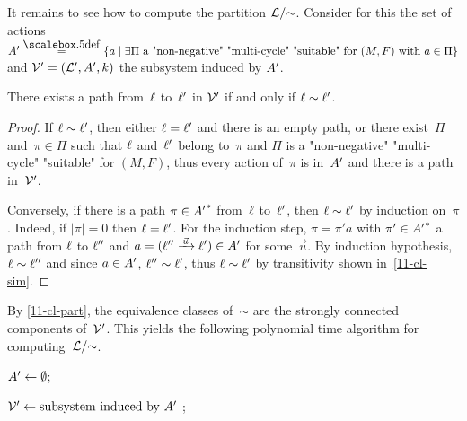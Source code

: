 \begin{scope}
\begin{algorithm}

\caption{$\text{cycle}(\?V,M,F)$}
\label{11-algo:zcycle}
\end{algorithm}

It remains to see how to compute the partition $\mathcal L/{\sim}$. Consider
for this the set of actions
$\Act'\eqdef\{a\mid\exists\Pi\text{ a "non-negative" "multi-cycle"
  "suitable" for $(M,F)$ with $a\in\Pi$}\}$ and
$\mathcal V'=(\mathcal L',A',k)$ the subsystem induced by $A'$.
\begin{claim}\label{11-cl-part}
  There exists a path from~$\ell$ to~$\ell'$ in $\mathcal V'$
  if and only if $\ell\sim\ell'$.
\end{claim}
\begin{proof}
  If $\ell\sim\ell'$, then either $\ell=\ell'$ and there is an empty
  path, or there exist~$\Pi$ and~$\pi\in\Pi$ such that $\ell$
  and~$\ell'$ belong to~$\pi$ and $\Pi$ is a "non-negative"
  "multi-cycle" "suitable" for $(M,F)$, thus every action of~$\pi$ is
  in~$A'$ and there is a path in~$\mathcal V'$.  

  Conversely, if there is a path $\pi\in{A'}^\ast$ from~$\ell$
  to~$\ell'$, then $\ell\sim\ell'$ by induction on~$\pi$.  Indeed, if
  $|\pi|=0$ then $\ell=\ell'$.  For the induction step, $\pi=\pi' a$
  with $\pi'\in{A'}^\ast$ a path from $\ell$ to $\ell''$ and
  $a=(\loc''\step{\vec u}\loc')\in\Act'$ for some~$\vec u$.  By
  induction hypothesis, $\ell\sim\ell''$ and since $a\in A'$,
  $\ell''\sim\ell'$, thus $\ell\sim\ell'$ by transitivity shown
  in~\cref{11-cl-sim}. 
\end{proof}

By \cref{11-cl-part}, the equivalence classes of~$\sim$ are the
strongly connected components of~$\mathcal V'$.  This yields the following
polynomial time algorithm for computing~$\mathcal L/{\sim}$.

\begin{algorithm}

$A'\leftarrow\emptyset$;


$\mathcal V'\leftarrow \text{subsystem induced by~$A'$}$ ;

\caption{$\text{partition}(\?V,M,F)$}
\label{11-algo:part}
\end{algorithm}


\end{scope}
